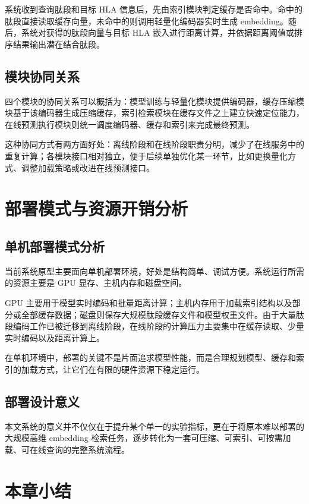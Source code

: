 系统收到查询肽段和目标 HLA 信息后，先由索引模块判定缓存是否命中。命中的肽段直接读取缓存向量，未命中的则调用轻量化编码器实时生成 embedding。随后，系统对获得的肽段向量与目标 HLA 嵌入进行距离计算，并依据距离阈值或排序结果输出潜在结合肽段。

\subsection{模块协同关系}

四个模块的协同关系可以概括为：模型训练与轻量化模块提供编码器，缓存压缩模块基于该编码器生成压缩缓存，索引检索模块在缓存文件之上建立快速定位能力，在线预测执行模块则统一调度编码器、缓存和索引来完成最终预测。

这种协同方式有两方面好处：离线阶段和在线阶段职责分明，减少了在线服务中的重复计算；各模块接口相对独立，便于后续单独优化某一环节，比如更换量化方式、调整加载策略或改进在线预测接口。

\section{部署模式与资源开销分析}

\subsection{单机部署模式分析}

当前系统原型主要面向单机部署环境，好处是结构简单、调试方便。系统运行所需的资源主要是 GPU 显存、主机内存和磁盘空间。

GPU 主要用于模型实时编码和批量距离计算；主机内存用于加载索引结构以及部分或全部缓存数据；磁盘则保存大规模肽段缓存文件和模型权重文件。由于大量肽段编码工作已被迁移到离线阶段，在线阶段的计算压力主要集中在缓存读取、少量实时编码以及距离计算上。

在单机环境中，部署的关键不是片面追求模型性能，而是合理规划模型、缓存和索引的加载方式，让它们在有限的硬件资源下稳定运行。

\subsection{部署设计意义}

本文系统的意义并不仅仅在于提升某个单一的实验指标，更在于将原本难以部署的大规模高维 embedding 检索任务，逐步转化为一套可压缩、可索引、可按需加载、可在线查询的完整系统流程。

\section{本章小结}

